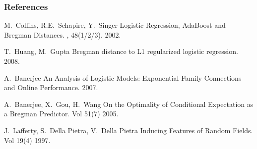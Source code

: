 \documentclass[10pt]{beamer}
\begin{document}
\begin{frame}[allowframebreaks]
  \frametitle<presentation>{References}
    
  \begin{thebibliography}{10}
    
  \beamertemplatearticlebibitems

    M.~Collins, R.E.~Schapire, Y.~Singer
    \newblock Logistic Regression, AdaBoost and Bregman Distances.
    , 48(1/2/3).
    2002.
    
    T.~Huang, M.~Gupta
    \newblock Bregman distance to L1 regularized logistic regression.
    2008.  
    
    A.~Banerjee
    \newblock An Analysis of Logistic Models:
Exponential Family Connections and Online Performance.
    2007.  
    
    A.~Banerjee, X.~Gou, H.~Wang
    \newblock  On the Optimality of Conditional Expectation as a Bregman Predictor.
     Vol 51(7)
    2005.  
    
    J.~Lafferty, S.~Della Pietra, V.~Della Pietra
    \newblock  Inducing Features of Random Fields.
     Vol 19(4)
    1997.
  \end{thebibliography}
\end{frame}
\end{document}
